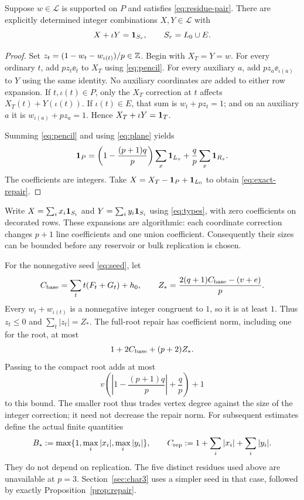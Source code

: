 \begin{proposition}\label{prop:repair}
Suppose $w\in\mathcal L$ is supported on $P$ and satisfies \eqref{eq:residue-pair}. There are explicitly determined integer combinations $X,Y\in\mathcal L$ with
\begin{equation}\label{eq:exact-repair}
 X+\iota Y=\mathbf1_{S_r},\qquad S_r=L_0\cup E.
\end{equation}
\end{proposition}
\begin{proof}
Set $z_t=(1-w_t-w_{\iota(t)})/p\in\mathbb Z$. Begin with $X_T=Y=w$. For every ordinary $t$, add $pz_t\ee_t$ to $X_T$ using \eqref{eq:pencil}. For every auxiliary $a$, add $pz_a\ee_{\iota(a)}$ to $Y$ using the same identity. No auxiliary coordinates are added to either row expansion. If $t,\iota(t)\in P$, only the $X_T$ correction at $t$ affects $X_T(t)+Y(\iota(t))$. If $\iota(t)\in E$, that sum is $w_t+pz_t=1$; and on an auxiliary $a$ it is $w_{\iota(a)}+pz_a=1$. Hence $X_T+\iota Y=\mathbf1_T$.

Summing \eqref{eq:pencil} and using \eqref{eq:plane} yields
\begin{equation}\label{eq:ordinary-indicator}
 \mathbf1_P=\left(1-\frac{(p+1)q}{p}\right)\sum_x\mathbf1_{L_x}
              +\frac qp\sum_x\mathbf1_{R_x}.
\end{equation}
The coefficients are integers. Take $X=X_T-\mathbf1_P+\mathbf1_{L_0}$ to obtain \eqref{eq:exact-repair}.
\end{proof}

Write $X=\sum_i x_i\mathbf1_{S_i}$ and $Y=\sum_i y_i\mathbf1_{S_i}$ using \eqref{eq:types}, with zero coefficients on decorated rows. These expansions are algorithmic: each coordinate correction changes $p+1$ line coefficients and one union coefficient. Consequently their sizes can be bounded before any reservoir or bulk replication is chosen.

For the nonnegative seed \eqref{eq:seed}, let
\begin{equation}\label{eq:repair-norms}
 C_{\rm base}=\sum_t t(F_t+G_t)+h_0,\qquad
 Z_*=\frac{2(q+1)C_{\rm base}-(v+e)}p.
\end{equation}
Every $w_t+w_{\iota(t)}$ is a nonnegative integer congruent to $1$, so it is at least $1$. Thus $z_t\le0$ and $\sum_t|z_t|=Z_*$. The full-root repair has coefficient norm, including one for the root, at most
\[
 1+2C_{\rm base}+(p+2)Z_*.
\]
Passing to the compact root adds at most
\[
 v\left(\left|1-\frac{(p+1)q}{p}\right|+\frac qp\right)+1
\]
to this bound. The smaller root thus trades vertex degree against the size of the integer correction; it need not decrease the repair norm. For subsequent estimates define the actual finite quantities
\begin{equation}\label{eq:repair-errors}
 B_*:=\max\{1,\max_i|x_i|,\max_i|y_i|\},\qquad
 C_{\rm rep}:=1+\sum_i|x_i|+\sum_i|y_i|.
\end{equation}
They do not depend on replication. The five distinct residues used above are unavailable at $p=3$. Section~\ref{sec:char3} uses a simpler seed in that case, followed by exactly Proposition~\ref{prop:repair}.
